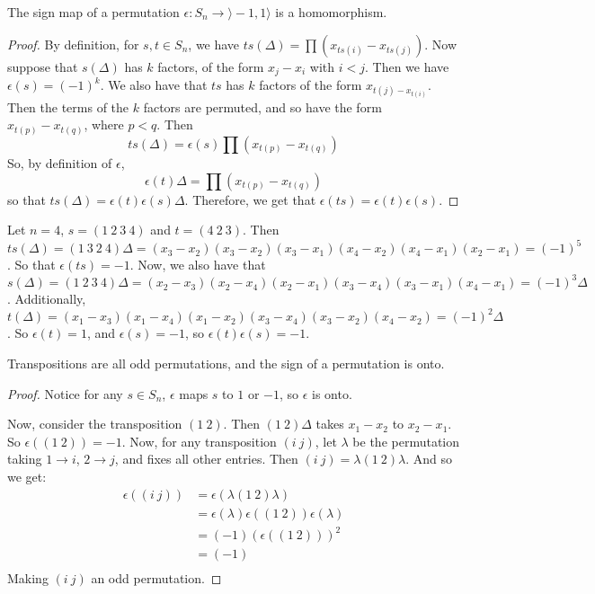 \begin{proposition}\label{proposition_3.6.2}
  The sign map of a permutation $\epsilon:S_n \rightarrow \rangle -1,1
  \rangle$ is a homomorphism.
\end{proposition}
\begin{proof}
  By definition, for $s,t \in S_n$, we have
  $ts(\Delta)=\prod{(x_{ts(i)}-x_{ts(j)})}$. Now suppose that $s(\Delta)$ has
  $k$ factors, of the form  $x_j-x_i$ with  $i<j$. Then we have
  $\epsilon(s)=(-1)^k$. We also have that $ts$ has  $k$ factors of the form
  $x_{t(j)-x_{t(i)}}$. Then the terms of the $k$ factors are permuted, and so
  have the form $x_{t(p)}-x_{t(q)}$, where $p<q$. Then
  \begin{equation*}
    ts(\Delta)=\epsilon(s)\prod{(x_{t(p)}-x_{t(q)})}
  \end{equation*}
  So, by definition of $\epsilon$,
  \begin{equation*}
    \epsilon(t)\Delta=\prod{(x_{t(p)}-x_{t(q)})}
  \end{equation*}
  so that $ts(\Delta)=\epsilon(t)\epsilon(s)\Delta$. Therefore, we get that
  $\epsilon(ts)=\epsilon(t)\epsilon(s)$.
\end{proof}

\begin{example}\label{example_3.13}
  Let $n=4$, $s=(1 \ 2 \ 3 \ 4)$ and  $t=(4 \ 2 \ 3)$. Then $ts(\Delta)=(1 \ 3
  \ 2 \ 4)\Delta=(x_3-x_2)(x_3-x_2)(x_3-x_1)(x_4-x_2)(x_4-x_1)(x_2-x_1)=(-1)^5$.
  So that $\epsilon(ts)=-1$. Now, we also have that $s(\Delta)=(1 \ 2 \ 3 \
  4)\Delta=(x_2-x_3)(x_2-x_4)(x_2-x_1)(x_3-x_4)(x_3-x_1)(x_4-x_1)=(-1)^3\Delta$.
  Additionally,
  $t(\Delta)=(x_1-x_3)(x_1-x_4)(x_1-x_2)(x_3-x_4)(x_3-x_2)(x_4-x_2)=(-1)^2\Delta$.
  So $\epsilon(t)=1$, and $\epsilon(s)=-1$, so $\epsilon(t)\epsilon(s)=-1$.
\end{example}

\begin{theorem}\label{theorem_3.6.3}
  Transpositions are all odd permutations, and the sign of a permutation is
  onto.
\end{theorem}
\begin{proof}
  Notice for any $s \in S_n$,  $\epsilon$ maps  $s$ to  $1$ or  $-1$, so
  $\epsilon$ is onto.

  Now, consider the transposition  $(1 \ 2)$. Then $(1 \ 2)\Delta$ takes
  $x_1-x_2$ to $x_2-x_1$. So $\epsilon((1 \ 2))=-1$. Now, for any
  transposition $(i \ j)$, let $\lambda$ be the permutation taking  $1
  \rightarrow i$, $2 \rightarrow j$, and fixes all other entries. Then $(i \
  j)=\lambda(1 \ 2)\lambda$. And so we get:
  \begin{align*}
    \epsilon((i \ j))       &=      \epsilon(\lambda(1 \ 2)\lambda)     \\
                            &=      \epsilon(\lambda)\epsilon((1 \ 2))\epsilon(\lambda) \\
                            &= (-1)(\epsilon((1 \ 2)))^2        \\
                            &= (-1)                     \\
  \end{align*}
  Making $(i \ j)$ an odd permutation.
\end{proof}

